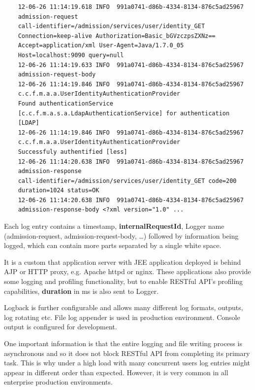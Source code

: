 	\begin{verbatim}
	12-06-26 11:14:19.618 INFO  991a0741-d86b-4334-8134-876c5ad25967 
	admission-request 
	call-identifier=/admission/services/user/identity_GET 
	Connection=keep-alive Authorization=Basic_bGVzczpsZXNz== 
	Accept=application/xml User-Agent=Java/1.7.0_05 
	Host=localhost:9090 query=null
	12-06-26 11:14:19.633 INFO  991a0741-d86b-4334-8134-876c5ad25967 
	admission-request-body
	12-06-26 11:14:19.846 INFO  991a0741-d86b-4334-8134-876c5ad25967 
	c.c.f.m.a.a.UserIdentityAuthenticationProvider 
	Found authenticationService 
	[c.c.f.m.a.s.a.LdapAuthenticationService] for authentication 
	[LDAP]
	12-06-26 11:14:19.846 INFO  991a0741-d86b-4334-8134-876c5ad25967 
	c.c.f.m.a.a.UserIdentityAuthenticationProvider 
	Successfuly authentified [less]
	12-06-26 11:14:20.638 INFO  991a0741-d86b-4334-8134-876c5ad25967 
	admission-response 
	call-identifier=/admission/services/user/identity_GET code=200 
	duration=1024 status=OK
	12-06-26 11:14:20.638 INFO  991a0741-d86b-4334-8134-876c5ad25967 
	admission-response-body <?xml version="1.0" ...
	\end{verbatim}
	
	Each log entry contains a timestamp, \textbf{internalRequestId}, Logger name (admission-request,
	admission-request-body, \ldots) followed by information being logged, which can contain more parts separated by a
	single white space.
	
	It is a custom that application server with JEE application deployed is  behind AJP or HTTP proxy, e.g.
	Apache httpd or nginx. These applications also provide some logging and profiling functionality, but to enable RESTful
	API's profiling capabilities, \textbf{duration} in ms is also sent to Logger.
	
	Logback is further configurable and allows many different log formats, outputs, log rotating etc. File log appender is
	used in production environment. Console output is configured for development.
	
	One important information is that the entire logging and file writing process is asynchronous and so it does not block
	RESTful API from completing its primary task. This is why under a high load with many concurrent users log entries
	might appear in different order than expected. However, it is very common in all enterprise production environments.
